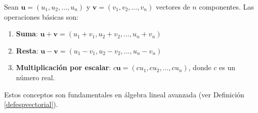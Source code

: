 \begin{definition}
Sean $\mathbf{u} = (u_1, u_2, \ldots, u_n)$ y $\mathbf{v} = (v_1, v_2, \ldots, v_n)$ vectores de $n$ componentes. Las operaciones básicas son:

\begin{enumerate}
\item \textbf{Suma}: $\mathbf{u} + \mathbf{v} = (u_1 + v_1, u_2 + v_2, \ldots, u_n + v_n)$

\item \textbf{Resta}: $\mathbf{u} - \mathbf{v} = (u_1 - v_1, u_2 - v_2, \ldots, u_n - v_n)$

\item \textbf{Multiplicación por escalar}: $c \mathbf{u} = (c u_1, c u_2, \ldots, c u_n)$, donde $c$ es un número real.
\end{enumerate}

Estos conceptos son fundamentales en álgebra lineal avanzada (ver Definición \ref{defespvectorial}).
\end{definition}

